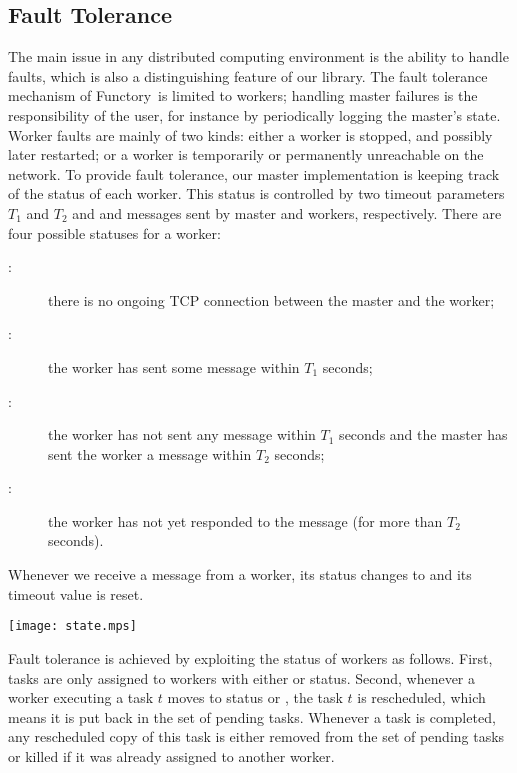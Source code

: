 \documentclass{llncs}
\newcommand{\functory}{\textsf{Functory}}
\begin{document}
\subsection{Fault Tolerance}\label{sec:fault}

The main issue in any distributed computing environment is the ability
to handle faults, which is also a distinguishing feature of our
library.  
The fault tolerance mechanism of \functory\ is limited to workers;
handling master failures is the responsibility of the user, for
instance by periodically logging the master's state.
Worker faults are mainly of two kinds: either a worker is stopped,
and possibly later restarted; or a worker is temporarily or
permanently unreachable on the network. To provide fault tolerance,
our master implementation is keeping track of the status of each
worker.  This status is controlled by two timeout parameters $T_1$ and
$T_2$ and  and  messages sent by master and workers,
respectively. There are four possible statuses for a worker:
\begin{description}
\item[:] there is no ongoing TCP connection between
  the master and the worker;
\item[:] the worker has sent some message
  within $T_1$ seconds;
\item[:] the worker has not sent any message within $T_1$
  seconds and the master has sent the worker a
   message within $T_2$ seconds;
\item[:] the worker has not yet responded to the 
  message (for more than $T_2$ seconds).
\end{description}
Whenever we receive a message from a worker, its status changes to
 and its timeout value is reset.
\begin{center}
  \texttt{[image: state.mps]}
\end{center}

Fault tolerance is achieved by exploiting the status of workers as
follows. First, tasks are only assigned to workers with either
 or  status. Second, whenever a worker executing
a task $t$ moves to status  or , the
task $t$ is rescheduled, which means it is put back in the set of
pending tasks. Whenever a task is completed, any rescheduled copy of
this task is either removed from the set of pending tasks or killed if
it was already assigned to another worker.
\end{document}
